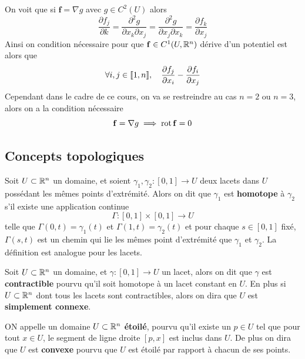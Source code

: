 \begin{remarque}
	On voit que si $\bm f = \nabla g$ avec $g \in C^2(U)$ alors
	\[
	\frac{\partial f_j}{\partial k} = \frac{\partial^2 g}{\partial x_k \partial x_j} = \frac{\partial^2 g}{\partial x_j \partial x_k} = \frac{\partial f_k}{\partial x_j}
	\]
	Ainsi on condition nécessaire pour que $\mathbf{f} \in C^1(U, \mathbb{R}^n)$ dérive d'un potentiel est alors que
	\[
	\forall i,j \in \llbracket 1, n \rrbracket, \quad \frac{\partial f_j}{\partial x_i} - \frac{\partial f_i}{\partial x_j}
	\]
	Cependant dans le cadre de ce cours, on va se restreindre au cas $n=2$ ou $n=3$, alors on a la condition nécessaire
	\[
	\mathbf{f} = \nabla g \implies \operatorname{rot} \mathbf{f} = 0
	\]
\end{remarque}

\subsection{Concepts topologiques}

\begin{definition}[Homotopie] \label{def: Homotopie}
	Soit $U \subset \mathbb{R}^n$ un domaine, et soient $\gamma_1, \gamma_2 : [0,1] \to U$ deux lacets dans $U$ possédant les mêmes points d'extrémité. Alors on dit que $\gamma_1$ est \textbf{homotope} à $\gamma_2$ s'il existe une application continue
	\[
	\Gamma: [0,1] \times [0,1] \to U
	\]
	telle que $\Gamma(0,t) =  \gamma_1(t)$ et $\Gamma(1,t) = \gamma_2(t)$ et pour chaque $s \in [0,1]$ fixé, $\Gamma(s,t)$ est un chemin qui lie les mêmes point d'extrémité que $\gamma_1$ et $\gamma_2$. La définition est analogue pour les lacets.
\end{definition}


\begin{definition} \label{def: Contractibilité et simplement connexe}
	Soit $U \subset \mathbb{R}^n$ un domaine, et $\gamma : [0,1] \to U$ un lacet, alors on dit que $\gamma$ est \textbf{contractible} pourvu qu'il soit homotope à un lacet constant en $U$. En plus si $U \subset \mathbb{R}^n$ dont tous les lacets sont contractibles, alors on dira que $U$ est \textbf{simplement connexe}.
\end{definition}

\begin{definition}[Étoilé] \label{def: Étoilé}
	ON appelle un domaine $U \subset \mathbb{R}^n$ \textbf{étoilé}, pourvu qu'il existe un $p \in U$ tel que pour tout $x \in U$, le segment de ligne droite $[p,x]$ est inclus dans $U$. De plus on dira que $U$ est \textbf{convexe} pourvu que $U$ est étoilé par rapport à chacun de ses points.
\end{definition}

